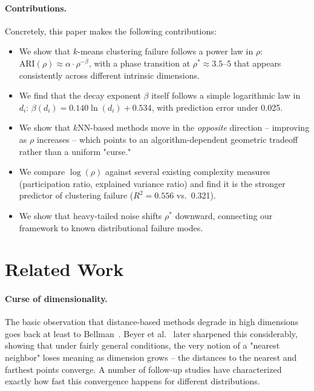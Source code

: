 \documentclass[pdflatex,sn-mathphys-num]{sn-jnl}
\theoremstyle{thmstyleone}
\begin{document}
\paragraph{Contributions.} Concretely, this paper makes the following
contributions:
\begin{itemize}
    \item We show that $k$-means clustering failure follows a power law in $\rho$:
    $\text{ARI}(\rho) \approx \alpha \cdot \rho^{-\beta}$, with a phase
    transition at $\rho^* \approx 3.5$--$5$ that appears consistently across
    different intrinsic dimensions.
    \item We find that the decay exponent $\beta$ itself follows a simple
    logarithmic law in $d_i$: $\beta(d_i) = 0.140 \ln(d_i) + 0.534$, with
    prediction error under 0.025.
    \item We show that $k$NN-based methods move in the \textit{opposite}
    direction -- improving as $\rho$ increases -- which points to an
    algorithm-dependent geometric tradeoff rather than a uniform "curse."
    \item We compare $\log(\rho)$ against several existing complexity measures
    (participation ratio, explained variance ratio) and find it is the
    stronger predictor of clustering failure ($R^2=0.556$ vs.\ 0.321).
    \item We show that heavy-tailed noise shifts $\rho^*$ downward,
    connecting our framework to known distributional failure modes.
\end{itemize}

\section{Related Work}

\paragraph{Curse of dimensionality.}
The basic observation that distance-based methods degrade in high dimensions
goes back at least to Bellman~\cite{bellman1957}. Beyer et al.~\cite{beyer1999}
later sharpened this considerably, showing that under fairly general
conditions, the very notion of a "nearest neighbor" loses meaning as dimension
grows -- the distances to the nearest and farthest points converge. A number of
follow-up studies have characterized exactly how fast this convergence happens
for different distributions.
\end{document}
